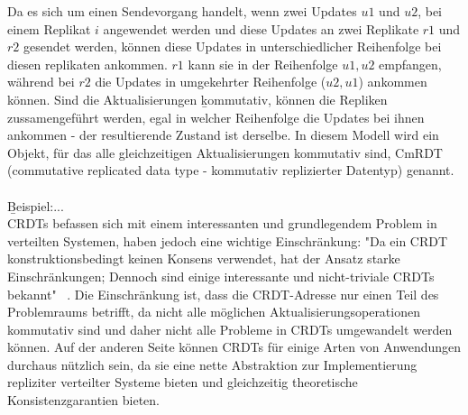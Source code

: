 Da es sich um einen Sendevorgang handelt, wenn zwei Updates $u1$ und $u2$, bei einem Replikat $i$ angewendet werden und diese Updates an zwei Replikate $r1$ und $r2$ gesendet werden, können diese Updates in unterschiedlicher Reihenfolge bei diesen replikaten ankommen. $r1$ kann sie in der Reihenfolge $u1, u2$ empfangen, während bei $r2$ die Updates in umgekehrter Reihenfolge ($u2, u1$) ankommen können. Sind die Aktualisierungen \b{kommutativ}, können die Repliken zussamengeführt werden, egal in welcher Reihenfolge die Updates bei ihnen ankommen - der resultierende Zustand ist derselbe. In diesem Modell wird ein Objekt, für das alle gleichzeitigen Aktualisierungen kommutativ sind, CmRDT (commutative replicated data type - kommutativ replizierter Datentyp) genannt. \\\\
\b{Beispiel:...}\\
CRDTs befassen sich mit einem interessanten und grundlegendem Problem in verteilten Systemen, haben jedoch eine wichtige Einschränkung: "Da ein CRDT konstruktionsbedingt keinen Konsens verwendet, hat der Ansatz starke Einschränkungen; Dennoch sind einige interessante und nicht-triviale CRDTs bekannt" ~\cite{crdt_shapiro2}. Die Einschränkung ist, dass die CRDT-Adresse nur einen Teil des Problemraums betrifft, da nicht alle möglichen Aktualisierungsoperationen kommutativ sind und daher nicht alle Probleme in CRDTs umgewandelt werden können. Auf der anderen Seite können CRDTs für einige Arten von Anwendungen durchaus nützlich sein, da sie eine nette Abstraktion zur Implementierung repliziter verteilter Systeme bieten und gleichzeitig theoretische Konsistenzgarantien bieten.
